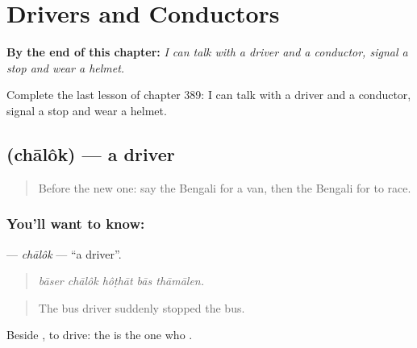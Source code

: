 
\chapter{Drivers and Conductors}
\label{ch:bn-drivers-and-conductors}

\begin{chapteropening}
\textbf{By the end of this chapter:} \emph{I can talk with a driver and a conductor, signal a stop and wear a helmet.}

Complete the last lesson of chapter 389: I can talk with a driver and a conductor, signal a stop and wear a helmet.
\end{chapteropening}

\section[\texorpdfstring{\bn{চালক} (chālôk)}{চালক (chālôk)}]{ (chālôk) — a driver}

\label{lesson:BN-C389-chalok}



\begin{quote}
Before the new one: say the Bengali for a van, then the Bengali for to race.
\end{quote}

\subsection*{You'll want to know: }
\textbf{} — \emph{chālôk} — \textquotedblleft{}a driver\textquotedblright{}.

\begin{quote}
    
\end{quote}

\begin{quote}
\emph{bāser chālôk hôṭhāt bās thāmālen.}
\end{quote}

\begin{quote}
The bus driver suddenly stopped the bus.
\end{quote}

Beside , to drive: the  is the one who .


